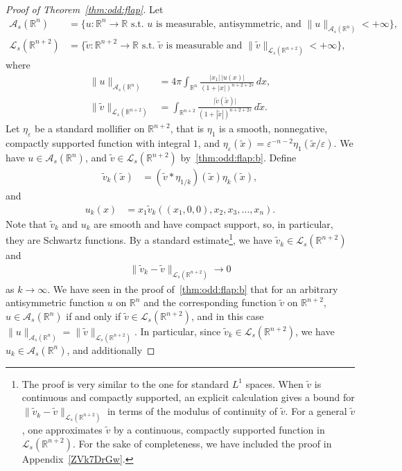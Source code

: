 \documentclass[a4paper,12pt,reqno]{amsart}
\numberwithin{equation}{section}
\theoremstyle{definition}
\theoremstyle{notation}
\newcommand{\R}{\mathds{R}}
\begin{document}
\begin{proof}[Proof of Theorem~\ref{thm:odd:flap}]
Let
\begin{align*}
    \mathscr A_s(\R^n) & = \{ u : \R^n \to \R \text{ s.t. } u \text{ is measurable, antisymmetric, and } \| u\|_{  \mathscr A_s(\R^n) }<+\infty \} , \\
    \mathscr L_s(\R^{n + 2}) & = \{ \tilde{v} : \R^{n + 2} \to \R \text{ s.t. } \tilde{v} \text{ is measurable and } \| \tilde{v}\|_{  \mathscr L_s(\R^{n+2}) }<+\infty \} ,
\end{align*}
where
\begin{equation}\label{AAAnorm}
\begin{split}
    \| u\|_{  \mathscr A_s(\R^n) } & ={4\pi} \int_{\R^n}\frac{|x_1|\,|  u(x)|}{(1 + |x|)^{n + 2 +2s}} \,dx , \\
    \| \tilde{v}\|_{\mathscr L_s(\R^{n+2})} & = \int_{\R^{n+2}}\frac{\vert\tilde{v}(\tilde{x})\vert}{(1 + |\tilde{x}|)^{n + 2 +2s}} \,d\tilde{x} .
\end{split}\end{equation}
Let $\eta_\varepsilon$ be a standard mollifier on $\R^{n + 2}$, that is $\eta_1$ is a smooth, nonnegative, compactly supported function with integral $1$, and $\eta_\varepsilon(\tilde x) = \varepsilon^{-n - 2} \eta_1(\tilde x / \varepsilon)$. We have $u \in \mathscr A_s(\R^n)$, and $\tilde v \in \mathscr L_s(\R^{n + 2})$ by~\ref{thm:odd:flap:b}. Define
\begin{align*}
 \tilde{v}_k(\tilde x) & = (\tilde{v} \ast \eta_{1/k})(\tilde x) \eta_k(\tilde x) ,
\end{align*}
and
\begin{align*}
 u_k(x) & = x_1 \tilde{v}_k((x_1, 0, 0), x_2, x_3, \ldots, x_n) .
\end{align*}
Note that $\tilde v_k$ and $u_k$ are smooth and have compact support, so, in particular, they are Schwartz functions. By a standard estimate\footnote{The proof is very similar to the one for standard $L^1$ spaces. When $\tilde v$ is continuous and compactly supported, an explicit calculation gives a bound for $\|\tilde v_k - \tilde v\|_{\mathscr L_s(\R^{n + 2})}$ in terms of the modulus of continuity of $\tilde v$. For a general $\tilde v$, one approximates $\tilde v$ by a continuous, compactly supported function in $\mathscr L_s(\R^{n + 2})$. For the sake of completeness, we have included the proof in Appendix~\ref{ZVk7DrGw}.}, we have $\tilde v_k \in \mathscr L_s(\R^{n + 2})$ and
\begin{align*}
 \|\tilde v_k - \tilde v\|_{\mathscr L_s(\R^{n + 2})} \to 0
\end{align*}
as $k \to \infty$. We have seen in the proof of~\ref{thm:odd:flap:b} that for an arbitrary antisymmetric function $u$ on $\R^n$ and the corresponding function $\tilde v$ on $\R^{n + 2}$, $u \in \mathscr A_s(\R^n)$ if and only if $\tilde v \in \mathscr L_s(\R^{n + 2})$, and in this case $\|u\|_{\mathscr A_s(\R^n)} = \|\tilde v\|_{\mathscr L_s(\R^{n + 2})}$. In particular, since $\tilde v_k \in \mathscr L_s(\R^{n + 2})$, we have $u_k \in \mathscr A_s(\R^n)$, and additionally

\end{proof}
\end{document}
